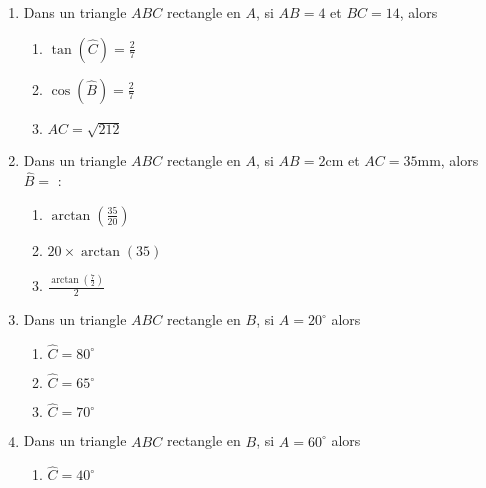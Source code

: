 \documentclass[oneside,twoside]{book}
\begin{document}
\begin{enumerate}
\item Dans un triangle $ABC$ rectangle en $A$, si $AB=4$ et $BC=14$, alors

\begin{enumerate}

\item\MauvaiseReponse $\tan (\hat{C})=\frac{2}{7}$

\item\BonneReponse $\cos (\hat{B})=\frac{2}{7}$
\item\MauvaiseReponse $AC=\sqrt{212}$


\end{enumerate}



\item Dans un triangle $ABC$ rectangle en $A$, si $AB=2\mathrm{cm}$ et $AC=35\mathrm{mm}$, alors $\hat{B}=$ :

\begin{enumerate}

\item\BonneReponse $\arctan\left(\frac{35}{20}\right)$
\item\MauvaiseReponse $20\times\arctan\left(35\right)$


\item\MauvaiseReponse $\frac{\arctan\left(\frac{7}{2}\right)}{2}$

\end{enumerate}



\item Dans un triangle $ABC$ rectangle en $B$, si $\widehat{A}=20^{\circ}$ alors

\begin{enumerate}

\item\MauvaiseReponse $\widehat{C}=80^{\circ}$

\item\MauvaiseReponse $\widehat{C}=65^{\circ}$

\item\BonneReponse $\widehat{C}=70^{\circ}$

\end{enumerate}



\item Dans un triangle $ABC$ rectangle en $B$, si $\widehat{A}=60^{\circ}$ alors

\begin{enumerate}

\item\MauvaiseReponse $\widehat{C}=40^{\circ}$


\end{enumerate}
\end{enumerate}
\end{document}
